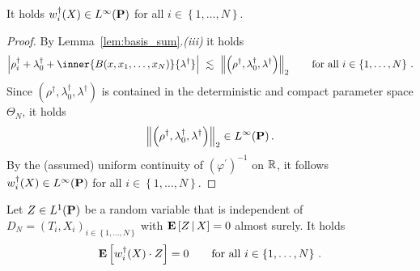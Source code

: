 \begin{lemma}
  \label{weights_l_inf}
  It holds
  $w_i^\dagger(X)\in L^\infty(\P)$
  for all $i\in \left\{ 1,\ldots,N \right\}$.
\end{lemma}
\begin{proof}
  By Lemma~\ref{lem:basis_sum}.\textit{(iii)} it holds
  \begin{align*}
  \left| 
    \rho_i^\dagger
    +
    \lambda_0^\dagger
    +
    \inner
    {B(x,x_1,\ldots,x_N)}
    {\lambda^\dagger}
  \right|
  \ 
  \lesssim
  \ 
  \norm{
\left( \rho^\dagger,\lambda_0^\dagger,\lambda^\dagger \right)
  }_2
  \qquad
  \text{for all}\ 
  i \in \left\{ 1,\ldots,N \right\}
  \,.
  \end{align*}
  Since
  $
\left( \rho^\dagger,\lambda_0^\dagger,\lambda^\dagger \right)
  $ is contained in the deterministic and compact parameter space $\Theta_N$,
  it holds
  \begin{align*}
  \norm{
\left( \rho^\dagger,\lambda_0^\dagger,\lambda^\dagger \right)
  }_2
  \in 
  L^{\infty}(\P)
  \,.
  \end{align*}
  By the (assumed) uniform continuity of 
  $
  (\varphi^{'})^{-1}
  $
  on $\R$, it follows 
  $w_i^\dagger(X)\in L^\infty(\P)$
  for all $i\in \left\{ 1,\ldots,N \right\}$.
\end{proof}
\begin{lemma}
  \label{w.Z=0}
 Let 
 $Z\in L^1(\P)$
  be a random variable that is independent of $D_N=(T_i,X_i)_{i\in \left\{
    1,\ldots,N
  \right\}}$ 
  with
  $
\E
\left[
  Z
  \,
  |
  \, 
  X
\right]
= 0
  $
  almost surely.
  It holds
  \begin{gather*}
  \E
  \left[
    w_i^\dagger(X)
  \cdot Z
  \right]
  =0
  \qquad
  \text{for all}
  \ 
  i\in \left\{ 1,\ldots,N \right\}
  \,.
  \end{gather*}
\end{lemma}
